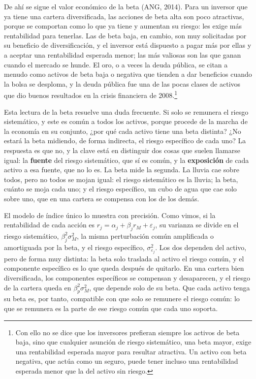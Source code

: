 \documentclass[10pt,a4paper]{article}
\begin{document}
De ahí se sigue el valor económico de la beta (ANG, 2014). Para un inversor que ya tiene una cartera diversificada, las acciones de beta alta son poco atractivas, porque se comportan como lo que ya tiene y aumentan su riesgo: les exige más rentabilidad para tenerlas. Las de beta baja, en cambio, son muy solicitadas por su beneficio de diversificación, y el inversor está dispuesto a pagar más por ellas y a aceptar una rentabilidad esperada menor; las más valiosas son las que ganan cuando el mercado se hunde. El oro, o a veces la deuda pública, se citan a menudo como activos de beta baja o negativa que tienden a dar beneficios cuando la bolsa se desploma, y la deuda pública fue una de las pocas clases de activos que dio buenos resultados en la crisis financiera de 2008.\footnote{%
    Con ello no se dice que los inversores prefieran siempre los activos de beta baja, sino que cualquier asunción de riesgo sistemático, una beta mayor, exige una rentabilidad esperada mayor para resultar atractiva. Un activo con beta negativa, que actúa como un seguro, puede tener incluso una rentabilidad esperada menor que la del activo sin riesgo.
}

Esta lectura de la beta resuelve una duda frecuente. Si solo se remunera el riesgo sistemático, y este es común a todos los activos, porque procede de la marcha de la economía en su conjunto, ¿por qué cada activo tiene una beta distinta? ¿No estará la beta midiendo, de forma indirecta, el riesgo específico de cada uno? La respuesta es que no, y la clave está en distinguir dos cosas que suelen llamarse igual: la \textbf{fuente} del riesgo sistemático, que sí es común, y la \textbf{exposición} de cada activo a esa fuente, que no lo es. La beta mide la segunda. La lluvia cae sobre todos, pero no todos se mojan igual: el riesgo sistemático es la lluvia; la beta, cuánto se moja cada uno; y el riesgo específico, un cubo de agua que cae solo sobre uno, que en una cartera se compensa con los de los demás.

El modelo de índice único lo muestra con precisión. Como vimos, si la rentabilidad de cada acción es $r_j=\alpha_j+\beta_jr_M+\varepsilon_j$, su varianza se divide en el riesgo sistemático, $\beta_j^2\sigma_M^2$, la misma perturbación común amplificada o amortiguada por la beta, y el riesgo específico, $\sigma_{\varepsilon_j}^2$. Los dos dependen del activo, pero de forma muy distinta: la beta solo traslada al activo el riesgo común, y el componente específico es lo que queda después de quitarlo. En una cartera bien diversificada, los componentes específicos se compensan y desaparecen, y el riesgo de la cartera queda en $\beta_p^2\sigma_M^2$, que depende solo de su beta. Que cada activo tenga su beta es, por tanto, compatible con que solo se remunere el riesgo común: lo que se remunera es la parte de ese riesgo común que cada uno soporta.
\end{document}
